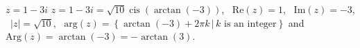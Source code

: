 { $z = 1-3i$ \label{polarcompbasiclast}}
{ $z =1-3i = \sqrt{10}\operatorname{cis}\left(\arctan\left(-3\right)\right)$, \, $\text{Re}(z) =1$, \, $\text{Im}(z) = -3$, \, $|z| =\sqrt{10}$, \, $\text{arg}(z) = \left\{\arctan\left(-3\right) + 2\pi k \, | \, \text{$k$ is an integer} \right\}$ and $\text{Arg}(z) =  \arctan\left(-3\right) = -\arctan(3)$.}
